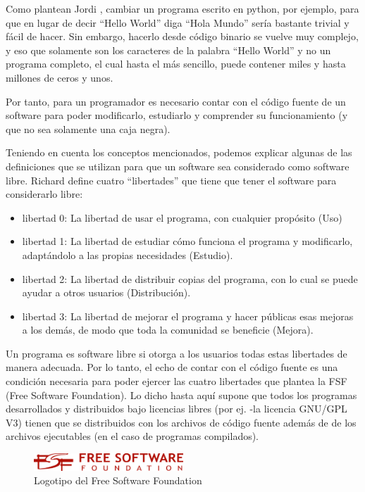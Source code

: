   
  
Como plantean Jordi \cite{adell_software_2007}, cambiar un programa escrito en python, por ejemplo, para que en lugar de decir “Hello World” diga “Hola Mundo” sería bastante trivial y fácil de hacer. Sin embargo, hacerlo desde código binario se vuelve muy complejo, y eso que solamente son los caracteres de la palabra “Hello World” y no un programa completo, el cual hasta el más sencillo, puede contener miles y hasta  millones de ceros y unos.

 Por tanto, para un programador es necesario contar con el código fuente de un software para poder modificarlo, estudiarlo y comprender su funcionamiento (y que no sea solamente una caja negra).
 
Teniendo en cuenta los conceptos mencionados, podemos explicar algunas de las definiciones que se utilizan para que un software sea considerado como software libre. Richard \cite{stallman_software_2007} define cuatro “libertades” que tiene que tener el software para considerarlo libre:

\begin{itemize}
   \item libertad 0: La libertad de usar el programa, con cualquier propósito (Uso)
   \item libertad 1: La libertad de estudiar cómo funciona el programa y modificarlo, adaptándolo a las propias necesidades (Estudio).
   \item libertad 2: La libertad de distribuir copias del programa, con lo cual se puede ayudar a otros usuarios (Distribución).
   \item libertad 3: La libertad de mejorar el programa y hacer públicas esas mejoras a los demás, de modo que toda la comunidad se beneficie (Mejora).
 \end{itemize} 
 
Un programa es software libre si otorga a los usuarios todas estas libertades de manera adecuada. Por lo tanto, el echo de contar con el código fuente es una condición necesaria para poder ejercer las cuatro libertades que plantea la FSF (Free Software Foundation). Lo dicho hasta aquí supone que todos los programas desarrollados y distribuidos bajo licencias libres (por ej. -la licencia GNU/GPL V3) tienen que se distribuidos con los archivos de código fuente además de de los archivos ejecutables (en el caso de programas compilados).

\begin{figure}[htb]
  \begin{center}
    \includegraphics[width=0.5\textwidth]{figuras/fsf.png}
    \caption{Logotipo del Free Software Foundation}
    \label{fig: }
  \end{center}
\end{figure}

